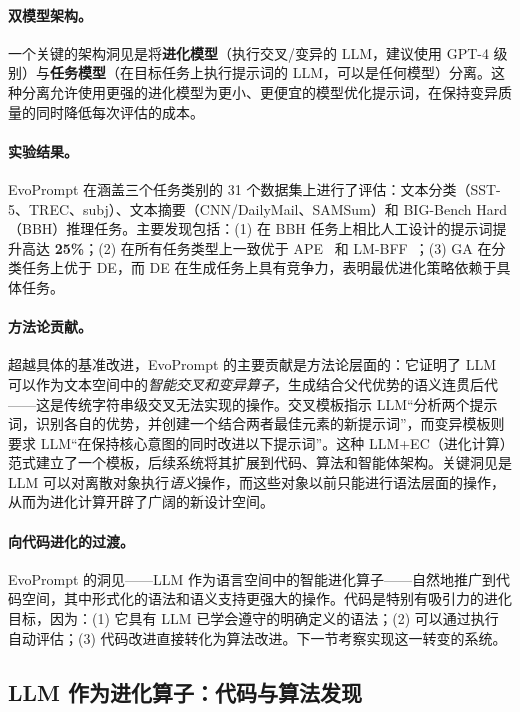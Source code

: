 \paragraph{双模型架构。}
一个关键的架构洞见是将\textbf{进化模型}（执行交叉/变异的 LLM，建议使用 GPT-4 级别）与\textbf{任务模型}（在目标任务上执行提示词的 LLM，可以是任何模型）分离。这种分离允许使用更强的进化模型为更小、更便宜的模型优化提示词，在保持变异质量的同时降低每次评估的成本。

\paragraph{实验结果。}
EvoPrompt 在涵盖三个任务类别的 31 个数据集上进行了评估：文本分类（SST-5、TREC、subj）、文本摘要（CNN/DailyMail、SAMSum）和 BIG-Bench Hard（BBH）推理任务。主要发现包括：(1) 在 BBH 任务上相比人工设计的提示词提升高达 \textbf{25\%}；(2) 在所有任务类型上一致优于 APE~\citep{zhou2023ape} 和 LM-BFF~\citep{gao2021lm}；(3) GA 在分类任务上优于 DE，而 DE 在生成任务上具有竞争力，表明最优进化策略依赖于具体任务。

\paragraph{方法论贡献。}
超越具体的基准改进，EvoPrompt 的主要贡献是方法论层面的：它证明了 LLM 可以作为文本空间中的\emph{智能交叉和变异算子}，生成结合父代优势的语义连贯后代——这是传统字符串级交叉无法实现的操作。交叉模板指示 LLM``分析两个提示词，识别各自的优势，并创建一个结合两者最佳元素的新提示词''，而变异模板则要求 LLM``在保持核心意图的同时改进以下提示词''。这种 LLM+EC（进化计算）范式建立了一个模板，后续系统将其扩展到代码、算法和智能体架构。关键洞见是 LLM 可以对离散对象执行\emph{语义}操作，而这些对象以前只能进行语法层面的操作，从而为进化计算开辟了广阔的新设计空间。

\paragraph{向代码进化的过渡。}
EvoPrompt 的洞见——LLM 作为语言空间中的智能进化算子——自然地推广到代码空间，其中形式化的语法和语义支持更强大的操作。代码是特别有吸引力的进化目标，因为：(1) 它具有 LLM 已学会遵守的明确定义的语法；(2) 可以通过执行自动评估；(3) 代码改进直接转化为算法改进。下一节考察实现这一转变的系统。


\subsection{LLM 作为进化算子：代码与算法发现}
\label{sec:ch4-evo-operator}

